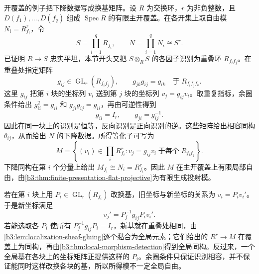 \ProseParagraphBreak
开覆盖的例子把下降数据写成换基矩阵。设 \(R\) 为交换环，\(r\) 为非负整数，且 \(D(f_1),\ldots,D(f_q)\) 组成 \(\operatorname{Spec}R\) 的有限主开覆盖。在各开集上取自由模 \(N_i=R_{f_i}^r\)，令
\[
	S=\prod_{i=1}^qR_{f_i},\qquad N=\prod_{i=1}^qN_i\cong S^r.
\]
已证明 \(R\to S\) 忠实平坦，本节开头又把 \(S\otimes_RS\) 的各因子识别为重叠环 \(R_{f_if_j}\)。在重叠处指定矩阵
\[
	g_{ij}\in\operatorname{GL}_r(R_{f_if_j}), \qquad g_{jk}g_{ij}=g_{ik}\quad\text{于}\;R_{f_if_jf_k}.
\]
这里 \(g_{ij}\) 把第 \(i\) 块的坐标列 \(v_i\) 送到第 \(j\) 块的坐标列 \(v_j=g_{ij}v_i\)。取重复指标，余圈条件给出 \(g_{ii}^2=g_{ii}\) 和 \(g_{ji}g_{ij}=g_{ii}\)，再由可逆性得到
\[
	g_{ii}=I_r,\qquad g_{ji}=g_{ij}^{-1}.
\]
因此在同一块上的识别是恒等，反向识别是正向识别的逆。这些矩阵给出相容同构 \(\theta_{ij}\)，从而给出 \(N\) 的下降数据。所得等化子可写为
\[
	M=\left\{(v_i)\in\prod_iR_{f_i}^r: v_j=g_{ij}v_i\;\text{于每个}\;R_{f_if_j}\right\}.
\]
下降同构在第 \(i\) 个分量上给出 \(M_{f_i}\cong N_i=R_{f_i}^r\)。因此 \(M\) 在主开覆盖上有限局部自由，由\cref{b3:thm:finite-presentation-flat-projective}为有限生成投射模。

若在第 \(i\) 块上用 \(P_i\in\operatorname{GL}_r(R_{f_i})\) 改换基，旧坐标与新坐标的关系为 \(v_i=P_iv_i'\)。于是新坐标满足
\[
	v_j'=P_j^{-1}g_{ij}P_iv_i'.
\]
若能选取各 \(P_i\) 使所有 \(P_j^{-1}g_{ij}P_i=I_r\)，新基就在重叠处相同，由\cref{b3:lem:localization-sheaf-gluing}逐个黏合为全局元素；它们给出的 \(R^r\to M\) 在覆盖上为同构，再由\cref{b3:thm:local-morphism-detection}得到全局同构。反过来，一个全局基在各块上的坐标矩阵正提供这样的 \(P_i\)。余圈条件只保证识别相容，并不保证能同时这样改换各块的基，所以所得模不一定全局自由。
